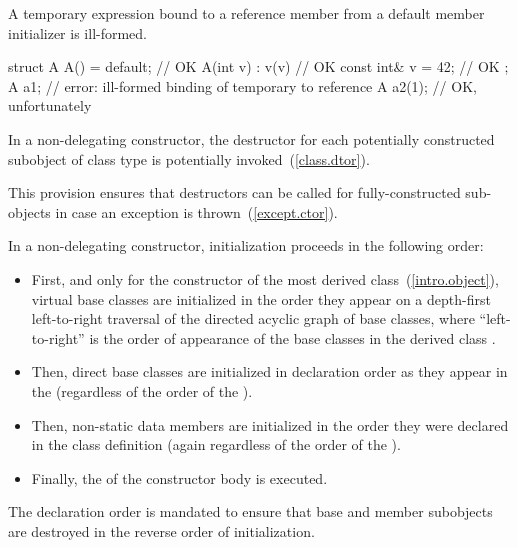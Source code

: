 \pnum
A temporary expression bound to a reference member from a
default member initializer is ill-formed.
\begin{example}
\begin{codeblock}
struct A {
  A() = default;          // OK
  A(int v) : v(v) { }     // OK
  const int& v = 42;      // OK
};
A a1;                     // error: ill-formed binding of temporary to reference
A a2(1);                  // OK, unfortunately
\end{codeblock}
\end{example}

\pnum
In a non-delegating constructor, the destructor for each potentially constructed
subobject of class type is potentially invoked~(\ref{class.dtor}).
\begin{note} This provision ensures that destructors can be called for fully-constructed
sub-objects in case an exception is thrown~(\ref{except.ctor}). \end{note}

\pnum
In a non-delegating constructor, initialization
proceeds in the following order:

\begin{itemize}
\item
{}%
First, and only for the constructor of the most derived class~(\ref{intro.object}),
virtual base classes are initialized in the order they appear on a
depth-first left-to-right traversal of the directed acyclic graph of
base classes,
where ``left-to-right'' is the order of appearance of the base classes
in the derived class
.
\item
{}%
Then, direct base classes are initialized in declaration order
as they appear in the
(regardless of the order of the
).
\item
{}%
Then, non-static data members are initialized in the order
they were declared in the class definition
(again regardless of the order of the
).
\item
Finally, the  of the constructor
body  is executed.
\end{itemize}

\begin{note}
The declaration order is mandated to ensure that base and member
subobjects are destroyed in the reverse order of initialization.
\end{note}

